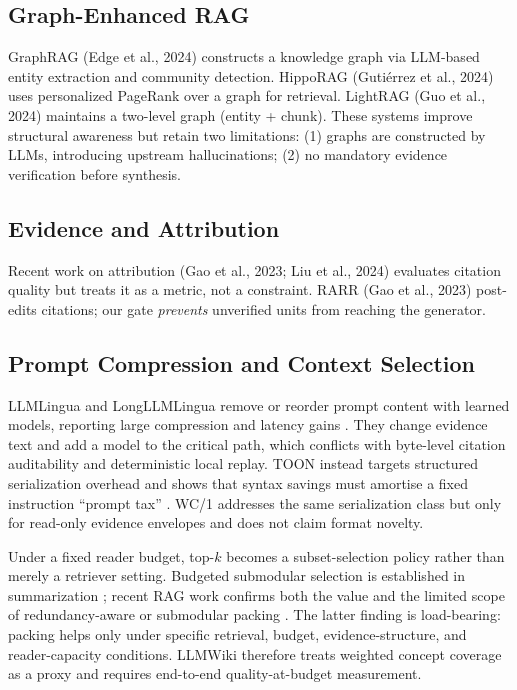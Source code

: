\subsection{Graph-Enhanced RAG}
GraphRAG (Edge et al., 2024) constructs a knowledge graph via LLM-based entity extraction and community detection. HippoRAG (Guti{\'e}rrez et al., 2024) uses personalized PageRank over a graph for retrieval. LightRAG (Guo et al., 2024) maintains a two-level graph (entity + chunk). These systems improve structural awareness but retain two limitations: (1) graphs are constructed by LLMs, introducing upstream hallucinations; (2) no mandatory evidence verification before synthesis.

\subsection{Evidence and Attribution}
Recent work on attribution (Gao et al., 2023; Liu et al., 2024) evaluates citation quality but treats it as a metric, not a constraint. RARR (Gao et al., 2023) post-edits citations; our gate \emph{prevents} unverified units from reaching the generator.

\subsection{Prompt Compression and Context Selection}
LLMLingua and LongLLMLingua remove or reorder prompt content with learned
models, reporting large compression and latency gains
\citep{jiang2023llmlingua,jiang2024longllmlingua}. They change evidence text
and add a model to the critical path, which conflicts with byte-level citation
auditability and deterministic local replay. TOON instead targets structured
serialization overhead and shows that syntax savings must amortise a fixed
instruction ``prompt tax'' \citep{matveev2026toon}. WC/1 addresses the same
serialization class but only for read-only evidence envelopes and does not
claim format novelty.

Under a fixed reader budget, top-$k$ becomes a subset-selection policy rather
than merely a retriever setting. Budgeted submodular selection is established
in summarization \citep{lin2010budgeted}; recent RAG work confirms both the
value and the limited scope of redundancy-aware or submodular packing
\citep{peng2025adagres,bala2026survives}. The latter finding is load-bearing:
packing helps only under specific retrieval, budget, evidence-structure, and
reader-capacity conditions. LLMWiki therefore treats weighted concept coverage
as a proxy and requires end-to-end quality-at-budget measurement.

